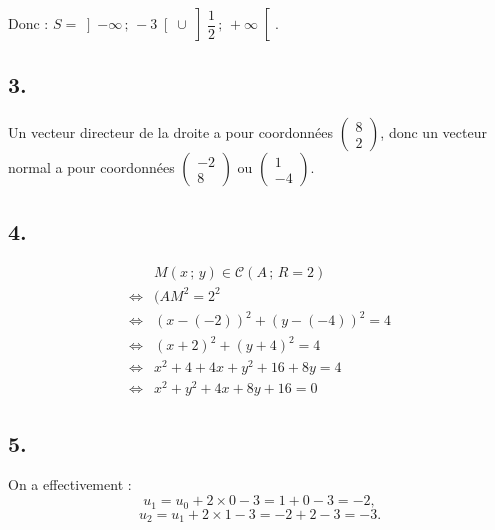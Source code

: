 Donc :
\(
S = \left] -\infty \,;\, -3 \right[ \cup \left] \dfrac{1}{2} \,;\, +\infty \right[.
\)

\subsection*{3.}

Un vecteur directeur de la droite a pour coordonnées \(\begin{pmatrix} 8 \\ 2 \end{pmatrix}\),
donc un vecteur normal a pour coordonnées \(\begin{pmatrix} -2 \\ 8 \end{pmatrix}\) ou \(\begin{pmatrix} 1 \\ -4 \end{pmatrix}\).

\subsection*{4.}

\begin{align*}
&M(x\,;\,y) \in \mathcal{C}(A\,;\,R = 2)\\
\iff& (AM^2 = 2^2\\
\iff &(x - (-2))^2 + (y - (-4))^2 = 4\\
\iff &(x + 2)^2 + (y + 4)^2 = 4\\
\iff &x^2 + 4 + 4x + y^2 + 16 + 8y = 4\\
\iff &x^2 + y^2 + 4x + 8y + 16 = 0
\end{align*}

\subsection*{5.}

On a effectivement :
\[
u_1 = u_0 + 2 \times 0 - 3 = 1 + 0 - 3 = -2,
\]
\[
u_2 = u_1 + 2 \times 1 - 3 = -2 + 2 - 3 = -3.
\]

